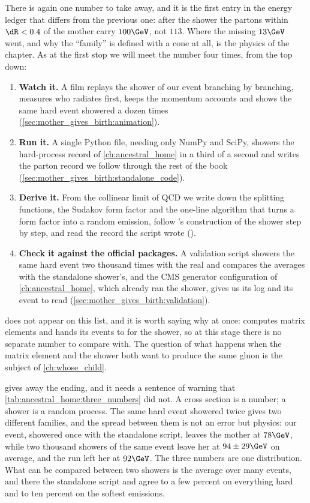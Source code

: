 There is again one number to take away, and it is the first entry in the
energy ledger that differs from the previous one: after the shower the
partons within $\dR<0.4$ of the mother carry $100\GeV$, not $113$. Where the
missing $13\GeV$ went, and why the ``family'' is defined with a cone at all,
is the physics of the chapter. As at the first stop we will meet the number
four times, from the top down:
\begin{enumerate}[nosep]
  \item \textbf{Watch it.} A film replays the shower of our event branching
    by branching, measures who radiates first, keeps the momentum accounts
    and shows the same hard event showered a dozen times
    (\cref{sec:mother_gives_birth:animation}).
  \item \textbf{Run it.} A single Python file, needing only NumPy and SciPy,
    showers the hard-process record of \cref{ch:ancestral_home} in a third
    of a second and writes the parton record we follow through the rest of
    the book (\cref{sec:mother_gives_birth:standalone_code}).
  \item \textbf{Derive it.} From the collinear limit of QCD we write down
    the splitting functions, the Sudakov form factor and the one-line
    algorithm that turns a form factor into a random emission, follow
    \PYTHIA's construction of the shower step by step, and read the record
    the script wrote
    ().
  \item \textbf{Check it against the official packages.} A validation
    script showers the same hard event two thousand times with the real
    \PYTHIA and compares the averages with the standalone shower's, and the
    CMS generator configuration of \cref{ch:ancestral_home}, which already
    ran the shower, gives us its log and its event to read
    (\cref{sec:mother_gives_birth:validation}).
\end{enumerate}
\MG does not appear on this list, and it is worth saying why at once: \MG
computes matrix elements and hands its events to \PYTHIA for the shower, so
at this stage there is no separate \MG number to compare with. The question of what
happens when the matrix element and the shower both want to produce the
same gluon is the subject of \cref{ch:whose_child}.

 gives away the ending, and it needs a
sentence of warning that \cref{tab:ancestral_home:three_numbers} did not.
A cross section is a number; a shower is a random process. The same hard
event showered twice gives two different families, and the spread between
them is not an error but physics: our event, showered once with the
standalone script, leaves the mother at $78\GeV$, while two thousand showers
of the same event leave her at $94\pm29\GeV$ on average, and the \CMSSW run
left her at $92\GeV$. The three numbers are one distribution. What can be
compared between two showers is the average over many events, and there the
standalone script and \PYTHIA agree to a few percent on everything hard and
to ten percent on the softest emissions.

